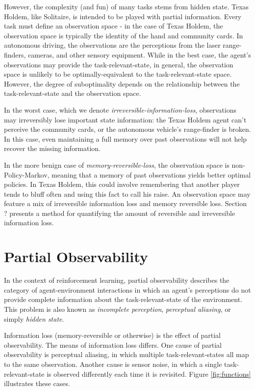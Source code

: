 \documentclass{article} %
\theoremstyle{definition}
\begin{document}
However, the complexity (and fun) of many tasks stems from hidden
state. Texas Holdem, like Solitaire, is intended to be played with
partial information. Every task must define an observation space - in
the case of Texas Holdem, the observation space is typically the
identity of the hand and community cards. In autonomous driving, the
observations are the perceptions from the laser range-finders,
cameras, and other sensory equipment. While in the best case, the
agent's observations may provide the task-relevant-state, in general,
the observation space is unlikely to be optimally-equivalent to the
task-relevant-state space. However, the degree of suboptimality
depends on the relationship between the task-relevant-state and the
observation space.

In the worst case, which we denote
\textit{irreversible-information-loss}, observations may irreversibly
lose important state information: the Texas Holdem agent can't
perceive the community cards, or the autonomous vehicle's range-finder
is broken. In this case, even maintaining a full memory over past
observations will not help recover the missing information.

In the more benign case of \textit{memory-reversible-loss}, the
observation space is non-Policy-Markov, meaning that a memory of past
observations yields better optimal policies. In Texas Holdem, this
could involve remembering that another player tends to bluff often and
using this fact to call his raise. An observation space may feature a
mix of irreversible information loss and memory reversible
loss. Section ? presents a method for quantifying the amount of
reversible and irreversible information loss.

\section{Partial Observability}
In the context of reinforcement learning, partial observability
describes the category of agent-environment interactions in which an
agent's perceptions do not provide complete information about the
task-relevant-state of the environment. This problem is also known as
\textit{incomplete perception}, \textit{perceptual aliasing}, or
simply \textit{hidden state}.

Information loss (memory-reversible or otherwise) is the effect of
partial observability. The means of information loss differs. One
cause of partial observability is perceptual aliasing, in which
multiple task-relevant-states all map to the same observation. Another
cause is sensor noise, in which a single task-relevant-state is
observed differently each time it is revisited. Figure
\ref{fig:functions} illustrates these cases.
\end{document}
